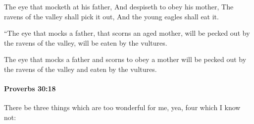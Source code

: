 			\begin{versebox}
					\item[BHS] 
					\item[ASV] The eye that mocketh at his father, And despiseth to obey his mother, The ravens of the valley shall pick it out, And the young eagles shall eat it.
					\item[NIV] “The eye that mocks a father, that scorns an aged mother, will be pecked out by the ravens of the valley, will be eaten by the vultures.
					\item[NRSV] The eye that mocks a father and scorns to obey a mother will be pecked out by the ravens of the valley and eaten by the vultures.
			\end{versebox}

		\paragraph{Proverbs 30:18} %
			\label{PROVERBS-30-18}

			There be three things which are too wonderful for me, yea, four which I know not:

